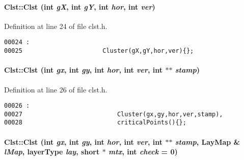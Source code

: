 \paragraph{\setlength{\rightskip}{0pt plus 5cm}Clst::Clst (int {\em g\-X}, int {\em g\-Y}, int {\em hor}, int {\em ver})}\hfill



Definition at line 24 of file clst.h.\small\begin{verbatim}00024 :
00025                      Cluster(gX,gY,hor,ver){};

\end{verbatim}\normalsize 
\label{Clst_a1}
\paragraph{\setlength{\rightskip}{0pt plus 5cm}Clst::Clst (int {\em gx}, int {\em gy}, int {\em hor}, int {\em ver}, int $\ast$$\ast$ {\em stamp})}\hfill



Definition at line 26 of file clst.h.\small\begin{verbatim}00026 :
00027                          Cluster(gx,gy,hor,ver,stamp),
00028                          criticalPoints(){};

\end{verbatim}\normalsize 
\label{Clst_a2}
\paragraph{\setlength{\rightskip}{0pt plus 5cm}Clst::Clst (int {\em gx}, int {\em gy}, int {\em hor}, int {\em ver}, int $\ast$$\ast$ {\em stamp}, {\bf Lay\-Map} \& {\em l\-Map}, {\bf layer\-Type} {\em lay}, short $\ast$ {\em mtx}, int {\em check} = 0)}\hfill



